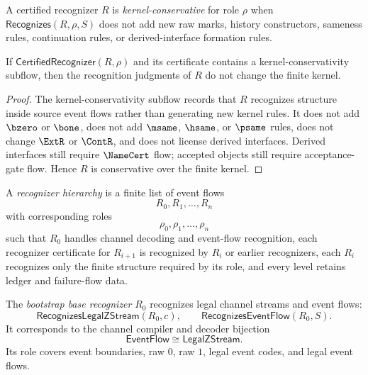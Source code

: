 \begin{definition}
\label{def:recognizer-generated-conservativity}
A certified recognizer $R$ is \emph{kernel-conservative} for role $\rho$ when $\mathsf{Recognizes}(R,\rho,S)$ does not add new raw marks, history constructors, sameness rules, continuation rules, or derived-interface formation rules.
\end{definition}

\begin{theorem}
\label{thm:recognizer-generated-certified-recognition-only}
If $\mathsf{CertifiedRecognizer}(R,\rho)$ and its certificate contains a kernel-conservativity subflow, then the recognition judgments of $R$ do not change the finite kernel.
\end{theorem}

\begin{proof}
The kernel-conservativity subflow records that $R$ recognizes structure inside source event flows rather than generating new kernel rules. It does not add $\bzero$ or $\bone$, does not add $\msame$, $\hsame$, or $\psame$ rules, does not change $\ExtR$ or $\ContR$, and does not license derived interfaces. Derived interfaces still require $\NameCert$ flow; accepted objects still require acceptance-gate flow. Hence $R$ is conservative over the finite kernel.
\end{proof}

\begin{definition}
\label{def:recognizer-generated-hierarchy}
A \emph{recognizer hierarchy} is a finite list of event flows
$$
  R_0,R_1,\ldots,R_n
$$
with corresponding roles
$$
  \rho_0,\rho_1,\ldots,\rho_n
$$
such that $R_0$ handles channel decoding and event-flow recognition, each recognizer certificate for $R_{i+1}$ is recognized by $R_i$ or earlier recognizers, each $R_i$ recognizes only the finite structure required by its role, and every level retains ledger and failure-flow data.
\end{definition}

\begin{definition}
\label{def:recognizer-generated-bootstrap-base}
The \emph{bootstrap base recognizer} $R_0$ recognizes legal channel streams and event flows:
$$
  \mathsf{RecognizesLegalZStream}(R_0,c),
  \qquad
  \mathsf{RecognizesEventFlow}(R_0,S).
$$
It corresponds to the channel compiler and decoder bijection
$$
  \mathsf{EventFlow}\cong\mathsf{LegalZStream}.
$$
Its role covers event boundaries, raw $0$, raw $1$, legal event codes, and legal event flows.
\end{definition}

